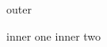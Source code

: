 \documentclass{article}
\begin{document}
\begin{algorithmic}
\State outer
\begin{algorithmic}
\State inner one
\State inner two
\end{algorithmic}
\end{algorithmic}
\end{document}
